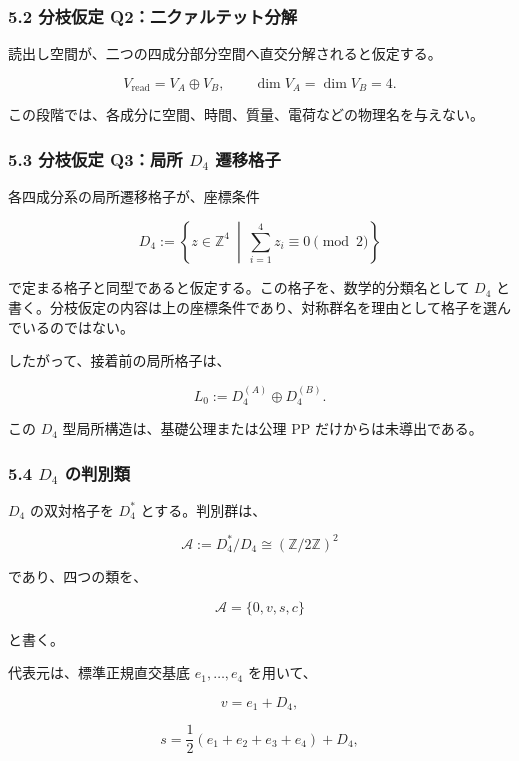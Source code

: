 \documentclass[
  a4paper,
  ja=minimal,
  xelatex,
  paragraph-mark={},
]{bxjsarticle}
\begin{document}
\subsubsection{5.2 分枝仮定
Q2：二クァルテット分解}\label{ux5206ux679dux4eeeux5b9a-q2ux4e8cux30afux30a1ux30ebux30c6ux30c3ux30c8ux5206ux89e3}

読出し空間が、二つの四成分部分空間へ直交分解されると仮定する。

\[
V_{\mathrm{read}}
{}=
V_A\oplus V_B,
\qquad
\dim V_A
{}=
\dim V_B
{}=4.
\]

この段階では、各成分に空間、時間、質量、電荷などの物理名を与えない。

\subsubsection{\texorpdfstring{5.3 分枝仮定 Q3：局所 \(D_4\)
遷移格子}{5.3 分枝仮定 Q3：局所 D\_4 遷移格子}}\label{ux5206ux679dux4eeeux5b9a-q3ux5c40ux6240-d_4-ux9077ux79fbux683cux5b50}

各四成分系の局所遷移格子が、座標条件

\[
D_4
:=
\left\{
z\in\mathbb Z^4
\ \middle|\
\sum_{i=1}^{4}z_i
\equiv0
\pmod2
\right\}
\]

で定まる格子と同型であると仮定する。この格子を、数学的分類名として
\(D_4\)
と書く。分枝仮定の内容は上の座標条件であり、対称群名を理由として格子を選んでいるのではない。

したがって、接着前の局所格子は、

\[
L_0
:=
D_4^{(A)}
\oplus
D_4^{(B)}.
\]

この \(D_4\) 型局所構造は、基礎公理または公理 PP
だけからは未導出である。

\subsubsection{\texorpdfstring{5.4 \(D_4\)
の判別類}{5.4 D\_4 の判別類}}\label{d_4-ux306eux5224ux5225ux985e}

\(D_4\) の双対格子を \(D_4^*\) とする。判別群は、

\[
\mathcal A
:=
D_4^*/D_4
\cong
(\mathbb Z/2\mathbb Z)^2
\]

であり、四つの類を、

\[
\mathcal A
{}=
\{0,v,s,c\}
\]

と書く。

代表元は、標準正規直交基底 \(e_1,\ldots,e_4\) を用いて、

\[
v=e_1+D_4,
\]

\[
s=
\frac12
(e_1+e_2+e_3+e_4)
{}+D_4,
\]
\end{document}
